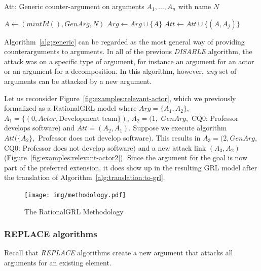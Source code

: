 \begin{algorithm}[b]
  \caption{Att: Generic counter-argument on arguments $A_1,\ldots,A_n$ with name $N$}\label{alg:generic}
  \begin{algorithmic}[1]
    \State $A \leftarrow (mintId(),GenArg, N)$\label{alg:generic:arg}
    \State $Arg\leftarrow Arg \cup \{A\}$\label{alg:generic:addarg}
    \label{alg:generic:for}
      \State $Att \leftarrow Att \cup \{(A,A_j)\}$\label{alg:generic:att}
    \EndFor
    \EndProcedure
  \end{algorithmic}
\end{algorithm}

Algorithm~\ref{alg:generic} can be regarded as the most general way of providing counterarguments to arguments. In all of the previous \emph{DISABLE} algorithm, the attack was on a specific type of argument, for instance an argument for an actor or an argument for a decomposition. In this algorithm, however, \emph{any} set of arguments can be attacked by a new argument.

Let us reconsider Figure~\ref{fig:examples:relevant-actor}, which we previously formalized as a RationalGRL model where $Arg=\{A_1,A_2\}$, $A_1 = \{(0,Actor,\text{Development team}\})$, $A_2= (1,$ $GenArg,$ CQ0: Professor develops software$)$ and $Att=(A_2,A_1)$. Suppose we execute algorithm $Att(\{A_2\},$ Professor does not develop software$)$. This results in $A_3=(2, GenArg,$ CQ0: Professor does not develop software$)$ and a new attack link $(A_3,A_2)$ (Figure~\ref{fig:examples:relevant-actor2}). Since the argument for the goal is now part of the preferred extension, it does show up in the resulting GRL model after the translation of Algorithm~\ref{alg:translation:to-grl}.

\begin{figure}[b]
\centering
\texttt{[image: img/methodology.pdf]}
\caption{The RationalGRL Methodology}
\label{fig:rationalgrl-methodology}
\end{figure}

\subsubsection{REPLACE algorithms}
\label{sect:formalframework:replace}

Recall that \emph{REPLACE} algorithms create a new argument that attacks all arguments for an existing element.

